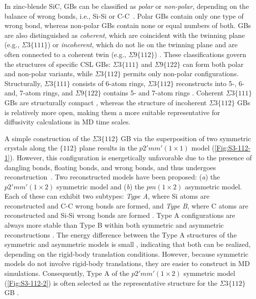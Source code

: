 \documentclass[%
preprint,
amsmath,amssymb,
aps,
]{revtex4-2}
\newcommand{\?}{\stackrel{?}{=}}
\begin{document}
In zinc-blende SiC, GBs can be classified as \textit{polar} or \textit{non-polar}, depending on the balance of wrong bonds, i.e., Si-Si or C-C~\cite{Kohyama1991}. Polar GBs contain only one type of wrong bond, whereas non-polar GBs contain none or equal numbers of both. GBs are also distinguished as \textit{coherent}, which are coincident with the twinning plane (e.g., $\Sigma 3\{111\}$) or \textit{incoherent}, which do not lie on the twinning plane and are often connected to a coherent twin (e.g., $\Sigma 9\{112\}$) \cite{Novikov2003}. These classifications govern the structures of specific CSL GBs: $\Sigma 3 \{111\}$ and $\Sigma 9\{122\}$ can form both polar and non-polar variants, while $\Sigma 3\{112\}$ permits only non-polar configurations. Structurally, $\Sigma 3 \{111\}$ consists of 6-atom rings, $\Sigma 3\{112\}$ reconstructs into 5-, 6- and, 7-atom rings, and $\Sigma 9\{122\}$ contains 5- and 7-atom rings \cite{Kohyama1991, Kohyama1994, Tanaka2002}. Coherent $\Sigma 3\{111\}$ GBs are structurally compact \cite{Kohler2002}, whereas the structure of incoherent $\Sigma 3\{112\}$ GBs is relatively more open, making them a more suitable representative for diffusivity calculations in MD time scales.

A simple construction of the $\Sigma 3 \{ 112 \}$ GB via the superposition of two symmetric crystals along the $\{112\}$ plane results in the $p2'mm' (1 \times 1)$ model (\cref{Fig:S3-112-1}). However, this configuration is energetically unfavorable due to the presence of dangling bonds, floating bonds, and wrong bonds, and thus undergoes reconstruction~\cite{Kohyama1994, Tanaka2002}. Two reconstructed models have been proposed: (\textit{a}) the $p2'mm' (1 \times 2)$ symmetric model and (\textit{b}) the $pm (1 \times 2)$ asymmetric model. Each of these can exhibit two subtypes: \textit{Type A}, where Si atoms are reconstructed and C-C wrong bonds are formed, and \textit{Type B}, where C atoms are reconstructed and Si-Si wrong bonds are formed \cite{Kohyama1994, Tanaka2002}. Type A configurations are always more stable than Type B within both symmetric and asymmetric reconstructions \cite{Kohyama1994, Tanaka2002}. The energy difference between the Type A structures of the symmetric and asymmetric models is small \cite{Tanaka2002}, indicating that both can be realized, depending on the rigid-body translation conditions. However, because symmetric models do not involve rigid-body translations, they are easier to construct in MD simulations. Consequently, Type A of the $p2'mm' (1 \times 2)$ symmetric model (\cref{Fig:S3-112-2}) is often selected as the representative structure for the $\Sigma 3 \{ 112 \}$ GB \cite{Khalil2011}.
\end{document}
